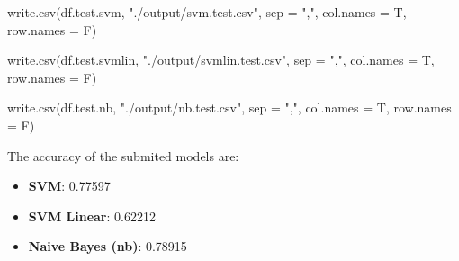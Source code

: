 \documentclass[
]{article}
\newenvironment{Shaded}{\begin{snugshade}}{\end{snugshade}}
\newcommand{\AttributeTok}[1]{\textcolor[rgb]{0.77,0.63,0.00}{#1}}
\newcommand{\FunctionTok}[1]{\textcolor[rgb]{0.00,0.00,0.00}{#1}}
\newcommand{\NormalTok}[1]{#1}
\newcommand{\StringTok}[1]{\textcolor[rgb]{0.31,0.60,0.02}{#1}}
\providecommand{\tightlist}{%
  \setlength{\itemsep}{0pt}\setlength{\parskip}{0pt}}
\begin{document}
\begin{Shaded}
\begin{Highlighting}[]
\FunctionTok{write.csv}\NormalTok{(df.test.svm,}
           \StringTok{"./output/svm.test.csv"}\NormalTok{,}
           \AttributeTok{sep =} \StringTok{","}\NormalTok{,}
           \AttributeTok{col.names =}\NormalTok{ T,}
           \AttributeTok{row.names =}\NormalTok{ F)}

\FunctionTok{write.csv}\NormalTok{(df.test.svmlin,}
           \StringTok{"./output/svmlin.test.csv"}\NormalTok{,}
           \AttributeTok{sep =} \StringTok{","}\NormalTok{,}
           \AttributeTok{col.names =}\NormalTok{ T,}
           \AttributeTok{row.names =}\NormalTok{ F)}

\FunctionTok{write.csv}\NormalTok{(df.test.nb,}
           \StringTok{"./output/nb.test.csv"}\NormalTok{,}
           \AttributeTok{sep =} \StringTok{","}\NormalTok{,}
           \AttributeTok{col.names =}\NormalTok{ T,}
           \AttributeTok{row.names =}\NormalTok{ F)}
\end{Highlighting}
\end{Shaded}

The accuracy of the submited models are:

\begin{itemize}
\tightlist
\item
  \textbf{SVM}: 0.77597
\item
  \textbf{SVM Linear}: 0.62212
\item
  \textbf{Naive Bayes (nb)}: 0.78915
\end{itemize}
\end{document}
